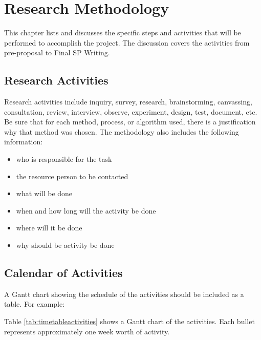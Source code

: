 \chapter{Research Methodology}
\label{chap:chap3}
This chapter lists and discusses the specific steps and activities that will be performed  to accomplish the project. 
The discussion covers the activities from pre-proposal to Final SP Writing.

\section{Research Activities}
Research activities include inquiry, survey, research, brainstorming, canvassing, consultation, review, interview, observe, experiment, design, test, document, etc.  
Be sure that for each method, process, or algorithm used, there is a justification why that method was chosen.
The methodology also includes the following information:

\begin{itemize}
   \item who is responsible for the task
   \item the resource person to be contacted
   \item what will be done
   \item when and how long will the activity be done
   \item where will it be done
   \item why should be activity be done
\end{itemize}


\section{Calendar of Activities}

A Gantt chart showing the schedule of the activities should be included as a table. For example:

Table \ref{tab:timetableactivities} shows a Gantt chart of the activities.  Each bullet represents approximately
one week worth of activity.

%
%
\newcommand{\weekone}{\textbullet}
\newcommand{\weektwo}{\textbullet \textbullet}
\newcommand{\weekthree}{\textbullet \textbullet \textbullet}
\newcommand{\weekfour}{\textbullet \textbullet \textbullet \textbullet}

